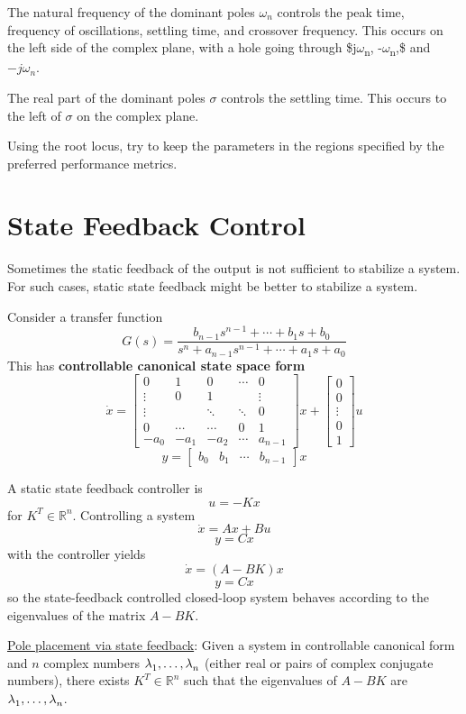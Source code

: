 \documentclass[11pt]{article}
\begin{document}
The natural frequency of the dominant poles \(\omega_{n}\) controls the peak time, frequency of
oscillations, settling time, and crossover frequency.
This occurs on the left side of the complex plane, with a hole going through \$j\(\omega\)\textsubscript{n}, -\(\omega\)\textsubscript{n},\$
and \(-j\omega_{n}\).

The real part of the dominant poles \(\sigma\) controls the settling time.
This occurs to the left of \(\sigma\) on the complex plane.

Using the root locus, try to keep the parameters in the regions specified by the preferred
performance metrics.
\section{State Feedback Control}
\label{sec:orgd6bf906}
Sometimes the static feedback of the output is not sufficient to stabilize a system.
For such cases, static state feedback might be better to stabilize a system.

Consider a transfer function
$$ G(s) = \frac{b_{n-1}s^{n-1} + \cdots + b_{1}s + b_{0}}{s^{n} + a_{n-1}s^{n-1} + \cdots + a_{1} s + a_{0}} $$
This has \textbf{controllable canonical state space form}
$$ \dot{x} = \begin{bmatrix} 0 & 1 & 0 & \cdots & 0 \\ \vdots & 0 & 1 & & \vdots \\ \vdots & & \ddots & \ddots & 0 \\ 0 & \cdots & \cdots & 0 & 1 \\ -a_{0} & -a_{1} & -a_{2} & \cdots & a_{n-1} \end{bmatrix}x + \begin{bmatrix} 0 \\ 0 \\ \vdots \\ 0 \\ 1 \end{bmatrix} u $$
$$ y = \begin{bmatrix} b_{0} & b_{1} & \cdots & b_{n-1} \end{bmatrix} x $$

A static state feedback controller is
$$ u = -Kx $$
for \(K^{T} \in \mathbb{R}^{n}\).
Controlling a system
$$ \dot{x} = Ax + Bu $$
$$y = Cx $$
with the controller yields
$$ \dot{x} = (A - BK) x $$
$$y = Cx $$
so the state-feedback controlled closed-loop system behaves according to the eigenvalues of
the matrix \(A - BK\).

\uline{Pole placement via state feedback}: Given a system in controllable canonical form and \(n\) complex
numbers \(\lambda^{\*}_{1}, \dots, \lambda^{\*}_{n}\) (either real or pairs of complex conjugate
numbers), there exists \(K^{T} \in \mathbb{R}^{n}\) such that the eigenvalues of \(A - BK\) are
\(\lambda^{\*}_{1}, \dots, \lambda_{n}^{\*}\).
\end{document}
